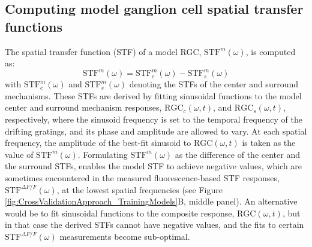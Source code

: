 \documentclass[11pt, oneside]{article}   	%
\begin{document}
\subsection{Computing model ganglion cell spatial transfer functions}
The spatial transfer function (STF) of a model RGC, $\mbox{STF}^{m}(\omega)$, is computed as: 
\begin{equation}
\mbox{STF}^{m}(\omega) = \mbox{STF}_{c}^{m}(\omega) - \mbox{STF}_{s}^{m}(\omega)
\end{equation}
%
\noindent with
%
$\mbox{STF}_{c}^{m}(\omega)$ and $\mbox{STF}_{s}^{m}(\omega)$ denoting the STFs of the center and surround mechanisms. These STFs are derived by fitting sinusoidal functions to the model center and surround mechanism responses, $\mbox{RGC}_c(\omega,t)$, and $\mbox{RGC}_s(\omega,t)$, respectively, where the sinusoid frequency is set to the temporal frequency of the drifting gratings, and its phase and amplitude are allowed to vary. At each spatial frequency, the amplitude of the best-fit sinusoid to $\mbox{RGC}(\omega,t)$ is taken as the value of $\mbox{STF}^{m}(\omega)$. Formulating $\mbox{STF}^{m}(\omega)$ as the difference of the center and the surround STFs, enables the model STF to achieve negative values, which are sometimes encountered in the measured fluorescence-based STF responses, $\mbox{STF}^{\Delta F / F}(\omega)$, at the lowest spatial frequencies (see Figure \ref{fig:CrossValidationApproach_TrainingModels}B, middle panel). An alternative would be to fit sinusoidal functions to the composite response, $\mbox{RGC}(\omega,t)$, but in that case the derived STFs cannot have negative values, and the fits to certain $\mbox{STF}^{\Delta F / F}(\omega)$ measurements become sub-optimal.
\end{document}

